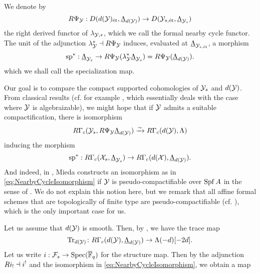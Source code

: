 \documentclass[../main.tex]{subfiles}
\begin{document}
\begin{defi}\label{def:FormalNearbyCycleFunctor}
  We denote by
  \begin{equation*}
    R \Psi_{\mathcal{Y}}: D(d(\mathcal{Y})_{\textnormal{\'et}}, {\underline \Lambda_{d(\mathcal{Y})}}) \to
    D(\mathcal{Y}_{s, \textnormal{\'et}},{\underline \Lambda_{\mathcal{Y}_{s}}})
  \end{equation*}
  the right derived functor of $\lambda_{\mathcal{Y},*}$, which we call the formal nearby
  cycle functor. The unit of the adjunction $\lambda_{\mathcal{Y}}^* \dashv 
  R \Psi_{\mathcal{Y}}$ induces, evaluated at $\underline \Lambda_{\mathcal{Y}_{s, \textnormal{\'et}}}$, a morphism
  \begin{equation*}
    \mathrm{sp}^* : \underline \Lambda_{\mathcal{Y}_{s}} \to 
    R \Psi_{\mathcal{Y}}( \lambda_{\mathcal{Y}}^* \underline \Lambda_{\mathcal{Y}_{s}}) = 
    R \Psi_{\mathcal{Y}}(\underline \Lambda_{d(\mathcal{Y})}).
  \end{equation*}
  which we shall call the specialization map.
\end{defi}

Our goal is to compare the compact supported cohomologies of $\mathcal{Y}_s$ and $d(\mathcal{Y})$.
From classical results (cf. for example \cite[Corollary 0.7.9]{huber2013etale}, which
essentially deals with the case where $\mathcal{Y}$ is algebraizable),
we might hope that if $\mathcal{Y}$ admits a suitable compactification, there is isomorphism
\begin{equation}\label{eq:NearbyCycleIsomorphism}
  R\Gamma_c(\mathcal{Y}_s, R\Psi_{\mathcal{Y}} \underline \Lambda_{d(\mathcal{Y})}) \xrightarrow{\sim} R\Gamma_c
  (d(\mathcal{Y}), \Lambda)
\end{equation}
inducing the morphism
\begin{equation*}
  \mathrm{sp}^*: R\Gamma_c(\mathcal{X}_s, \underline \Lambda_{\mathcal{Y}_s}) \to R \Gamma_c(d(\mathcal{X}), \underline
  \Lambda_{d(\mathcal{Y})}).
\end{equation*}
And indeed, in \cite[Corollary 4.29]{mieda2014variants}, Mieda constructs an
isomorphism as in \eqref{eq:NearbyCycleIsomorphism}
if $\mathcal{Y}$ is pseudo-compactifiable over $\operatorname{Spf} A$ in the sense of \cite[Definition
4.24]{mieda2014variants}. We do not explain this notion here, but we remark that
all affine formal schemes that are topologically of finite type are
pseudo-compactifiable (cf. \cite[Example 4.25]{mieda2014variants}), which is
the only important case for us.

Let us assume that $d(\mathcal{Y})$ is smooth. Then, by \cite[7.3.4]{huber2013etale}, we have
the trace map
\begin{equation*}
  \operatorname{Tr}_{d(\mathcal{Y})} \colon R \Gamma_c( d(\mathcal{Y}), \underline \Lambda_{d(\mathcal{Y})} ) \to 
  \Lambda(-d)[-2d].
\end{equation*}
Let us write $i: \mathcal{F}_s \to \operatorname{Spec}({\overline {\mathbb{F}}_q})$ for the structure map. Then by the 
adjunction $Ri_! \dashv i^!$ and the isomorphism in \eqref{eq:NearbyCycleIsomorphism},
we obtain a map
\end{document}
